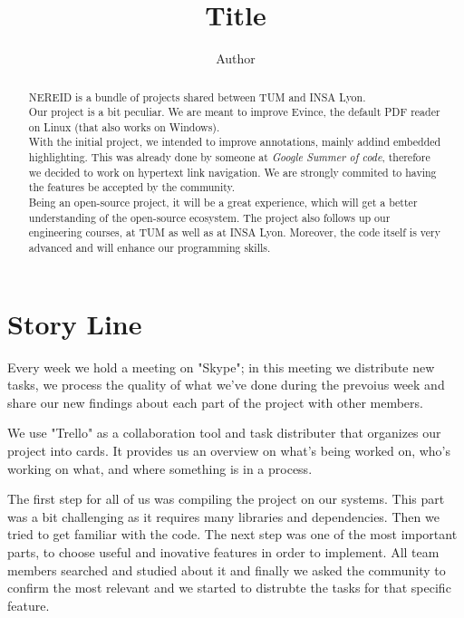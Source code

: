 \documentclass{article}%
\begin{document}
\title{ Title }
\author[]{ Author}
\maketitle

\newpage

\begin{abstract}

NEREID is a bundle of projects shared between TUM and INSA Lyon. \\

Our project is a bit peculiar. We are meant to improve Evince, the default PDF
reader on Linux (that also works on Windows).\\

With the initial project, we intended to improve annotations, mainly addind
embedded highlighting. This was already done by someone at \emph{Google Summer
of code}, therefore we decided to work on hypertext link navigation. We are
strongly commited to having the features be accepted by the community. \\

Being an open-source project, it will be a great experience, which will get a
better understanding of the open-source ecosystem. The project also follows up
our engineering courses, at TUM as well as at INSA Lyon. Moreover, the code
itself is very advanced and will enhance our programming skills.

\end{abstract}

\section{Story Line}
Every week we hold a meeting on "Skype"; in this meeting we distribute new tasks, we process the quality of what we've done during the prevoius week and share our new findings about each part of the project with other members.

We use "Trello" as a collaboration tool and task distributer that organizes our project into cards. It provides us an overview on what's being worked on, who's working on what, and where something is in a process.

The first step for all of us was compiling the project on our systems. This part was a bit challenging as it requires many libraries and dependencies. Then we tried to get familiar with the code. The next step was one of the most important parts, to choose useful and inovative features in order to implement. All team members searched and studied about it and finally we asked the community to confirm the most relevant and we started to distrubte the tasks for that specific feature.
\end{document}
